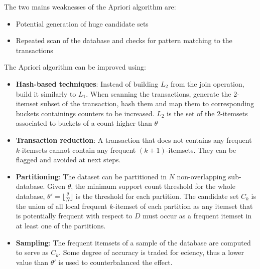 \documentclass[12pt, openany]{report}
\theoremstyle{definition}
\begin{document}
The two mains weaknesses of the Apriori algorithm are:
\begin{itemize}
    \item Potential generation of huge candidate sets
    \item Repeated scan of the database and checks for pattern matching to the transactions
\end{itemize}
The Apriori algorithm can be improved using:
\begin{itemize}
    \item \textbf{Hash-based techniques}: Instead of building $L_2$ from the join operation, build it similarly to $L_1$. When scanning the transactions, generate the 2-itemset subset of the transaction, hash them and map them to corresponding buckets containings counters to be increased. $L_2$ is the set of the 2-itemsets associated to buckets of a count higher than $\theta$
    \item \textbf{Transaction reduction}: A transaction that does not contains any frequent $k$-itemsets cannot contain any frequent $(k+1)$-itemsets. They can be flagged and avoided at next steps.
    \item \textbf{Partitioning}: The dataset can be partitioned in $N$ non-overlapping sub-database. Given $\theta$, the minimum support count threshold for the whole database, $\theta' = \lfloor \frac{\theta}{N} \rfloor$ is the threshold for each partition. The candidate set $C_k$ is the union of all local frequent $k$-itemset of each partition as any itemset that is potentially frequent with respect to $D$ must occur as a frequent itemset in at least one of the partitions.
    \item \textbf{Sampling}: The frequent itemsets of a sample of the database are computed to serve as $C_k$. Some degree of accuracy is traded for eciency, thus a lower value than $\theta'$ is used to counterbalanced the effect.
\end{itemize}
\end{document}

